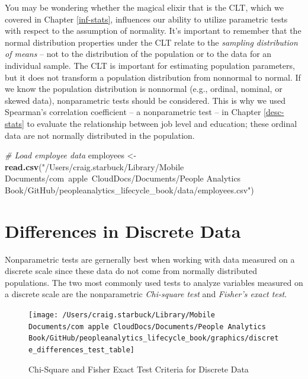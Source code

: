 \documentclass[]{book}
\newenvironment{Shaded}{\begin{snugshade}}{\end{snugshade}}
\newcommand{\CommentTok}[1]{\textcolor[rgb]{0.56,0.35,0.01}{\textit{#1}}}
\newcommand{\KeywordTok}[1]{\textcolor[rgb]{0.13,0.29,0.53}{\textbf{#1}}}
\newcommand{\NormalTok}[1]{#1}
\newcommand{\StringTok}[1]{\textcolor[rgb]{0.31,0.60,0.02}{#1}}
\begin{document}
You may be wondering whether the magical elixir that is the CLT, which we covered in Chapter \ref{inf-stats}, influences our ability to utilize parametric tests with respect to the assumption of normality. It's important to remember that the normal distribution properties under the CLT relate to the \emph{sampling distribution of means} -- not to the distribution of the population or to the data for an individual sample. The CLT is important for estimating population parameters, but it does not transform a population distribution from nonnormal to normal. If we know the population distribution is nonnormal (e.g., ordinal, nominal, or skewed data), nonparametric tests should be considered. This is why we used Spearman's correlation coefficient -- a nonparametric test -- in Chapter \ref{desc-stats} to evaluate the relationship between job level and education; these ordinal data are not normally distributed in the population.

\begin{Shaded}
\begin{Highlighting}[]
\CommentTok{# Load employee data}
\NormalTok{employees <-}\StringTok{ }\KeywordTok{read.csv}\NormalTok{(}\StringTok{"/Users/craig.starbuck/Library/Mobile Documents/com~apple~CloudDocs/Documents/People Analytics Book/GitHub/peopleanalytics_lifecycle_book/data/employees.csv"}\NormalTok{)}
\end{Highlighting}
\end{Shaded}

\hypertarget{differences-in-discrete-data}{%
\section{Differences in Discrete Data}\label{differences-in-discrete-data}}

Nonparametric tests are gernerally best when working with data measured on a discrete scale since these data do not come from normally distributed populations. The two most commonly used tests to analyze variables measured on a discrete scale are the nonparametric \emph{Chi-square test} and \emph{Fisher's exact test}.

\begin{figure}

{\centering \texttt{[image: /Users/craig.starbuck/Library/Mobile Documents/com~apple~CloudDocs/Documents/People Analytics Book/GitHub/peopleanalytics\_lifecycle\_book/graphics/discrete\_differences\_test\_table]} 

}

\caption{Chi-Square and Fisher Exact Test Criteria for Discrete Data}\label{fig:discrete-tests}
\end{figure}
\end{document}
